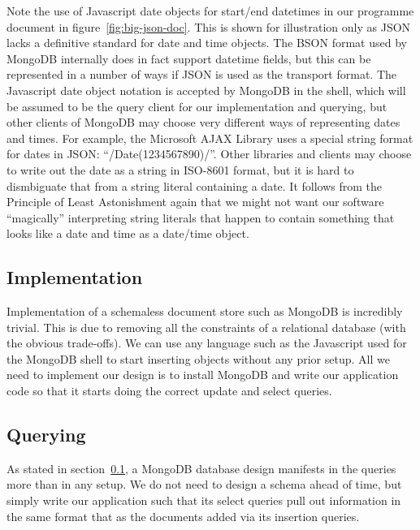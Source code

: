 \documentclass[11pt,a4paper]{article}
\begin{document}
Note the use of Javascript date objects for start/end datetimes in our
programme document in figure~\ref{fig:big-json-doc}. This is
shown for illustration only as JSON lacks a definitive standard for date
and time objects. The BSON format used by MongoDB internally does
in fact support datetime fields, but this can be represented in a
number of ways if JSON is used as the transport format. The Javascript
date object notation is accepted by MongoDB in the shell, which
will be assumed to be the query client for our implementation and
querying, but other clients of MongoDB may choose very different
ways of representing dates and times. For example, the
Microsoft AJAX Library uses a special string format for dates in JSON:
``/Date(1234567890)/''. \cite{ms-ajax-json-dates} Other libraries
and clients may choose to write out the date as a string in ISO-8601 format,
but it is hard to dismbiguate that from a string literal containing
a date. It follows from the Principle of Least Astonishment again
that we might not want our software ``magically'' interpreting
string literals that happen to contain something that looks like a date
and time as a date/time object.

\subsection{Implementation}
\label{sec:mongo-implementation}

Implementation of a schemaless document store such as MongoDB is
incredibly trivial. This is due to removing all the constraints
of a relational database (with the obvious trade-offs). We can use
any language such as the Javascript used for the MongoDB shell to
start inserting objects without any prior setup. All we need to implement
our design is to install MongoDB and write our application code so that
it starts doing the correct update and select queries.

\subsection{Querying}
\label{sec:mongo-querying}

As stated in section~\ref{sec:mongo-implementation}, a MongoDB database
design manifests in the queries more than in any setup. We do not need
to design a schema ahead of time, but simply write our application such
that its select queries pull out information in the same format that
as the documents added via its insertion queries.
\end{document}
